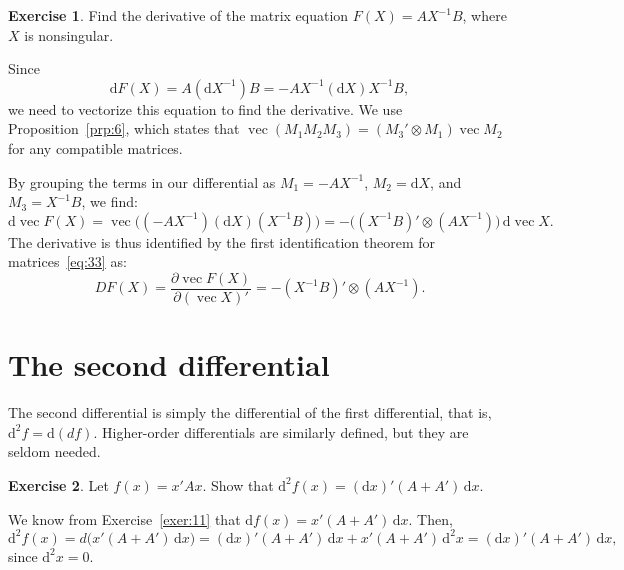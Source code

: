 \documentclass[12pt,a4paper]{article}
\makeatletter
\theoremstyle{definition}
\newtheorem{exercise}{Exercise}
\renewenvironment{proof}[1][\proofname]{\par
  \pushQED{\qed}%
  \normalfont \topsep6\p@\@plus6\p@\relax
  \trivlist
  \item[\hskip\labelsep\bfseries #1\@addpunct{.}]\ignorespaces
}{%
  \popQED\endtrivlist\@endpefalse
}
\newenvironment{solution}{%
  \begin{proof}[Solution]%
}{%
  \end{proof}%
}
\DeclareMathOperator{\avec}{vec}
\newcommand{\dd}{\mathrm{d}}
\makeatother
\begin{document}
\begin{exercise}\label{exer:22}
Find the derivative of the matrix equation $F(X) = AX^{-1}B$, where $X$ is nonsingular.
\end{exercise}


\begin{solution}
Since
\[
\dd F(X) = A(\dd X^{-1})B = -AX^{-1}(\dd X)X^{-1}B,
\]
we need to vectorize this equation to find the derivative. We use Proposition~\ref{prp:6}, which states that $\avec(M_1 M_2 M_3) = (M_3' \otimes M_1) \avec M_2$ for any compatible matrices. %

By grouping the terms in our differential as $M_1 = -AX^{-1}$, $M_2 = \dd X$, and $M_3 = X^{-1}B$, we find:
\[
\dd\avec F(X) = \avec\bigl((-AX^{-1})(\dd X)(X^{-1}B)\bigr) = -\bigl((X^{-1}B)' \otimes (AX^{-1})\bigr)\, \dd\avec X.
\]
The derivative is thus identified by the first identification theorem for matrices~\eqref{eq:33} as:
\[
DF(X) = \frac{\partial \avec F(X)}{\partial(\avec X)'} = -(X^{-1}B)' \otimes (AX^{-1}).
\]
% 
\end{solution}

\section{The second differential}\label{sec:9}

The second differential is simply the differential of the first differential, that is, $\dd^2 f = \dd(df)$. Higher-order differentials are similarly defined, but they are seldom needed. %

\begin{exercise}\label{exer:23}
Let $f(x) = x'Ax$. Show that $\dd^2 f(x) = (\dd x)'(A + A')\, \dd x$.
\end{exercise}

\begin{solution}
We know from Exercise~\ref{exer:11} that $\dd f(x) = x'(A + A')\, \dd x$. Then,
\[
\dd^2 f(x) = d\bigl(x'(A + A')\, \dd x\bigr) = (\dd x)'(A + A')\, \dd x + x'(A + A')\, \dd^2 x
= (\dd x)'(A + A')\, \dd x,
\]
since $\dd^2 x = 0$. %
\end{solution}
\end{document}
